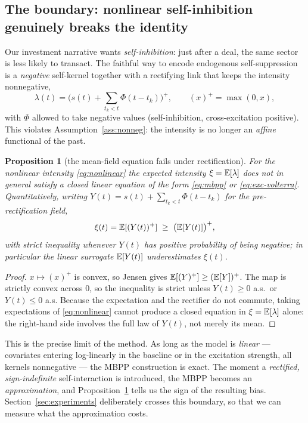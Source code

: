 \documentclass[11pt]{article}
\theoremstyle{plain}
\newtheorem{proposition}[theorem]{Proposition}
\theoremstyle{definition}
\theoremstyle{remark}
\begin{document}
\subsection{The boundary: nonlinear self-inhibition genuinely breaks the identity}

Our investment narrative wants \emph{self-inhibition}: just after a deal, the same
sector is less likely to transact. The faithful way to encode endogenous
self-suppression is a \emph{negative} self-kernel together with a rectifying link
that keeps the intensity nonnegative,
\begin{equation}
\lambda(t)=\Big(s(t)+\textstyle\sum_{t_k<t}\Phi(t-t_k)\Big)^+,\qquad (x)^+=\max(0,x),
\label{eq:nonlinear}
\end{equation}
with $\Phi$ allowed to take negative values (self-inhibition, cross-excitation
positive). This violates Assumption~\ref{ass:nonneg}: the intensity is no longer an
\emph{affine} functional of the past.

\begin{proposition}[the mean-field equation fails under rectification]
\label{prop:nonlinear}
For the nonlinear intensity \eqref{eq:nonlinear} the expected intensity
$\xi=\mathbb{E}[\lambda]$ does \emph{not} in general satisfy a closed linear equation of
the form \eqref{eq:mbpp} or \eqref{eq:exc-volterra}. Quantitatively, writing
$Y(t)=s(t)+\sum_{t_k<t}\Phi(t-t_k)$ for the pre-rectification field,
\[
\xi(t)=\mathbb{E}[(Y(t))^+]\;\ge\;\big(\mathbb{E}[Y(t)]\big)^+,
\]
with strict inequality whenever $Y(t)$ has positive probability of being negative;
in particular the linear surrogate $\mathbb{E}[Y(t)]$ \emph{underestimates} $\xi(t)$.
\end{proposition}
\begin{proof}
$x\mapsto(x)^+$ is convex, so Jensen gives
$\mathbb{E}[(Y)^+]\ge(\mathbb{E}[Y])^+$. The map is strictly convex across $0$, so the inequality
is strict unless $Y(t)\ge0$ a.s.\ or $Y(t)\le 0$ a.s. Because the expectation and
the rectifier do not commute, taking expectations of \eqref{eq:nonlinear} cannot
produce a closed equation in $\xi=\mathbb{E}[\lambda]$ alone: the right-hand side involves
the full law of $Y(t)$, not merely its mean.
\end{proof}

This is the precise limit of the method. As long as the model is \emph{linear} ---
covariates entering log-linearly in the baseline or in the excitation strength,
all kernels nonnegative --- the MBPP construction is exact. The moment a
\emph{rectified, sign-indefinite} self-interaction is introduced, the MBPP becomes
an \emph{approximation}, and Proposition~\ref{prop:nonlinear} tells us the sign of
the resulting bias. Section~\ref{sec:experiments} deliberately crosses this
boundary, so that we can measure what the approximation costs.
\end{document}
